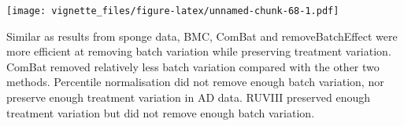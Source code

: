 \documentclass[]{book}
\newenvironment{Shaded}{\begin{snugshade}}{\end{snugshade}}
\newcommand{\KeywordTok}[1]{\textcolor[rgb]{0.13,0.29,0.53}{\textbf{#1}}}
\newcommand{\DataTypeTok}[1]{\textcolor[rgb]{0.13,0.29,0.53}{#1}}
\newcommand{\DecValTok}[1]{\textcolor[rgb]{0.00,0.00,0.81}{#1}}
\newcommand{\FloatTok}[1]{\textcolor[rgb]{0.00,0.00,0.81}{#1}}
\newcommand{\StringTok}[1]{\textcolor[rgb]{0.31,0.60,0.02}{#1}}
\newcommand{\OperatorTok}[1]{\textcolor[rgb]{0.81,0.36,0.00}{\textbf{#1}}}
\newcommand{\NormalTok}[1]{#1}
\begin{document}
\begin{Shaded}
\end{Shaded}

\texttt{[image: vignette\_files/figure-latex/unnamed-chunk-68-1.pdf]}

Similar as results from sponge data, BMC, ComBat and removeBatchEffect
were more efficient at removing batch variation while preserving
treatment variation. ComBat removed relatively less batch variation
compared with the other two methods. Percentile normalisation did not
remove enough batch variation, nor preserve enough treatment variation
in AD data. RUVIII preserved enough treatment variation but did not
remove enough batch variation.
\end{document}
